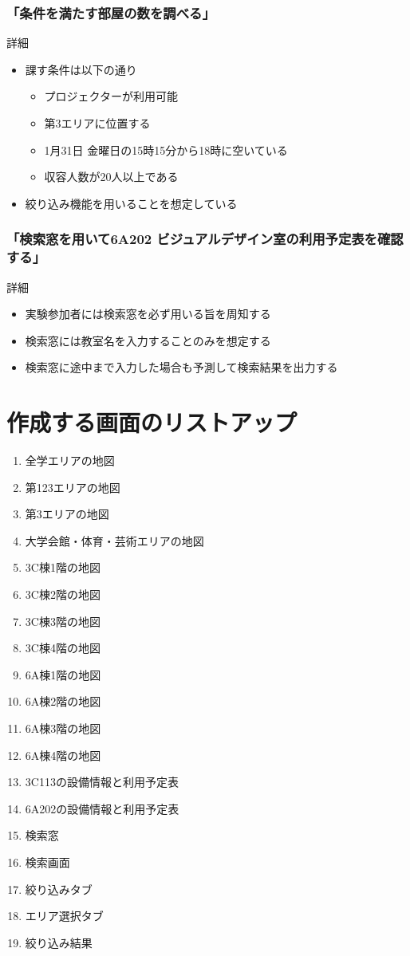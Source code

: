 \documentclass[12pt,a4paper,dvipdf]{jsarticle}
\begin{document}
\subsubsection{「条件を満たす部屋の数を調べる」}
詳細
\begin{itemize}
    \item 課す条件は以下の通り
          \begin{itemize}
              \item プロジェクターが利用可能
              \item 第3エリアに位置する
              \item 1月31日 金曜日の15時15分から18時に空いている
              \item 収容人数が20人以上である
          \end{itemize}
    \item 絞り込み機能を用いることを想定している
\end{itemize}

\subsubsection{「検索窓を用いて6A202 ビジュアルデザイン室の利用予定表を確認する」}
詳細
\begin{itemize}
    \item 実験参加者には検索窓を必ず用いる旨を周知する
    \item 検索窓には教室名を入力することのみを想定する
    \item 検索窓に途中まで入力した場合も予測して検索結果を出力する
\end{itemize}

\section{作成する画面のリストアップ}
\begin{enumerate}
    \item 全学エリアの地図
    \item 第123エリアの地図
    \item 第3エリアの地図
    \item 大学会館・体育・芸術エリアの地図
    \item 3C棟1階の地図
    \item 3C棟2階の地図
    \item 3C棟3階の地図
    \item 3C棟4階の地図
    \item 6A棟1階の地図
    \item 6A棟2階の地図
    \item 6A棟3階の地図
    \item 6A棟4階の地図
    \item 3C113の設備情報と利用予定表
    \item 6A202の設備情報と利用予定表
    \item 検索窓
    \item 検索画面
    \item 絞り込みタブ
    \item エリア選択タブ
    \item 絞り込み結果
\end{enumerate}
\end{document}
